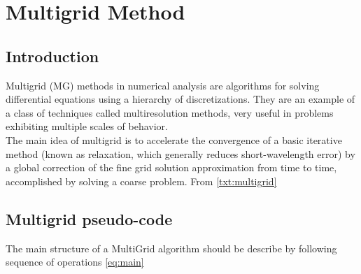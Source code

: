     \chapter{Multigrid Method}
    \section{Introduction}
    Multigrid (MG) methods in numerical analysis are algorithms for solving differential equations using a hierarchy of discretizations. They are an example of a class of techniques called multiresolution methods, very useful in problems exhibiting multiple scales of behavior.\\
     The main idea of multigrid is to accelerate the convergence of a basic iterative method (known as relaxation, which generally reduces short-wavelength error) by a global correction of the fine grid solution approximation from time to time, accomplished by solving a coarse problem. From \ref{txt:multigrid}
     

\section{Multigrid pseudo-code}

The main structure of a MultiGrid algorithm should be describe by following sequence of operations \ref{eq:main}

